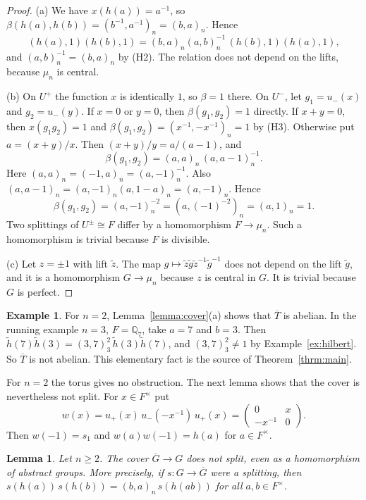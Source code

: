 \documentclass[12pt,letterpaper]{amsart}
\numberwithin{equation}{section}
\newtheorem{lemma}[theorem]{Lemma}
\theoremstyle{definition}
\newtheorem{example}[theorem]{Example}
\theoremstyle{remark}
\newcommand{\Gbar}{\overline{G}}
\newcommand{\mat}[4]{\begin{pmatrix} #1 & #2\\ #3 & #4\end{pmatrix}}
\begin{document}
\begin{proof}
(a) We have $x(h(a))=a^{-1}$, so
$\beta(h(a),h(b))=(b^{-1},a^{-1})_n=(b,a)_n$. Hence
\[
(h(a),1)(h(b),1)=(b,a)_n(a,b)_n^{-1}\,(h(b),1)(h(a),1),
\]
and $(a,b)_n^{-1}=(b,a)_n$ by (H2). The relation does not depend on
the lifts, because $\mu_n$ is central.

(b) On $U^+$ the function $x$ is identically $1$, so $\beta=1$ there.
On $U^-$, let $g_1=u_-(x)$ and $g_2=u_-(y)$. If $x=0$ or $y=0$, then
$\beta(g_1,g_2)=1$ directly. If $x+y=0$, then $x(g_1g_2)=1$ and
$\beta(g_1,g_2)=(x^{-1},-x^{-1})_n=1$ by (H3). Otherwise put
$a=(x+y)/x$. Then $(x+y)/y=a/(a-1)$, and
\[
\beta(g_1,g_2)=(a,a)_n\,(a,a-1)_n^{-1}.
\]
Here $(a,a)_n=(-1,a)_n=(a,-1)_n^{-1}$. Also
$(a,a-1)_n=(a,-1)_n(a,1-a)_n=(a,-1)_n$. Hence
\[
\beta(g_1,g_2)=(a,-1)_n^{-2}=(a,(-1)^{-2})_n=(a,1)_n=1.
\] Two splittings of
$U^\pm\cong F$ differ by a homomorphism $F\to\mu_n$. Such a
homomorphism is trivial because $F$ is divisible.

(c) Let $z=\pm 1$ with lift $\tilde z$. The map
$g\mapsto\tilde z\tilde g\tilde z^{-1}\tilde g^{-1}$ does not depend on
the lift $\tilde g$, and it is a homomorphism $G\to\mu_n$ because $z$
is central in $G$. It is trivial because $G$ is perfect.
\end{proof}

\begin{example}
\label{ex:cover}
For $n=2$, Lemma~\ref{lemma:cover}(a) shows that $\overline{T}$ is
abelian. In the running example $n=3$, $F=\mathbb{Q}_7$, take $a=7$ and
$b=3$. Then $\tilde h(7)\tilde h(3)=(3,7)_3^2\,\tilde h(3)\tilde
h(7)$, and $(3,7)_3^2\neq 1$ by Example~\ref{ex:hilbert}. So
$\overline{T}$ is not abelian. This elementary fact is the source of
Theorem~\ref{thrm:main}.
\end{example}

For $n=2$ the torus gives no obstruction. The next lemma shows that the
cover is nevertheless not split. For $x\in F^\times$ put
\[
w(x)=u_+(x)\,u_-(-x^{-1})\,u_+(x)=\mat 0x{-x^{-1}}0 .
\]
Then $w(-1)=s_1$ and $w(a)w(-1)=h(a)$ for $a\in F^\times$.

\begin{lemma}
\label{lemma:nonsplit}
Let $n\geq 2$. The cover $\Gbar\to G$ does not split, even as a
homomorphism of abstract groups. More precisely, if $s:G\to\Gbar$ were
a splitting, then $s(h(a))\,s(h(b))=(b,a)_n\,s(h(ab))$ for all
$a,b\in F^\times$.
\end{lemma}
\end{document}
